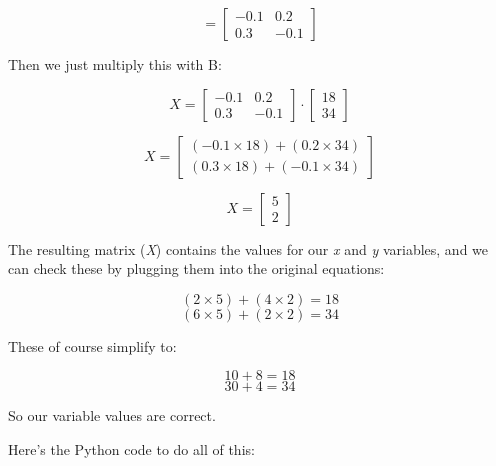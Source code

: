\documentclass[11pt]{article}
\begin{document}
\begin{equation}=\begin{bmatrix}-0.1 & 0.2\\0.3 & -0.1\end{bmatrix}\end{equation}

Then we just multiply this with B:

\begin{equation}X = \begin{bmatrix}-0.1 & 0.2\\0.3 & -0.1\end{bmatrix} \cdot \begin{bmatrix}18\\34\end{bmatrix}\end{equation}

\begin{equation}X = \begin{bmatrix}(-0.1 \times 18)+(0.2 \times 34)\\(0.3\times18)+(-0.1\times34)\end{bmatrix}\end{equation}

\begin{equation}X = \begin{bmatrix}5\\2\end{bmatrix}\end{equation}

The resulting matrix (\emph{X}) contains the values for our \emph{x} and
\emph{y} variables, and we can check these by plugging them into the
original equations:

\begin{equation}(2\times5) + (4\times2) = 18\end{equation}
\begin{equation}(6\times5) + (2\times2) = 34\end{equation}

These of course simplify to:

\begin{equation}10 + 8 = 18\end{equation}
\begin{equation}30 + 4 = 34\end{equation}

So our variable values are correct.

Here's the Python code to do all of this:
\end{document}
